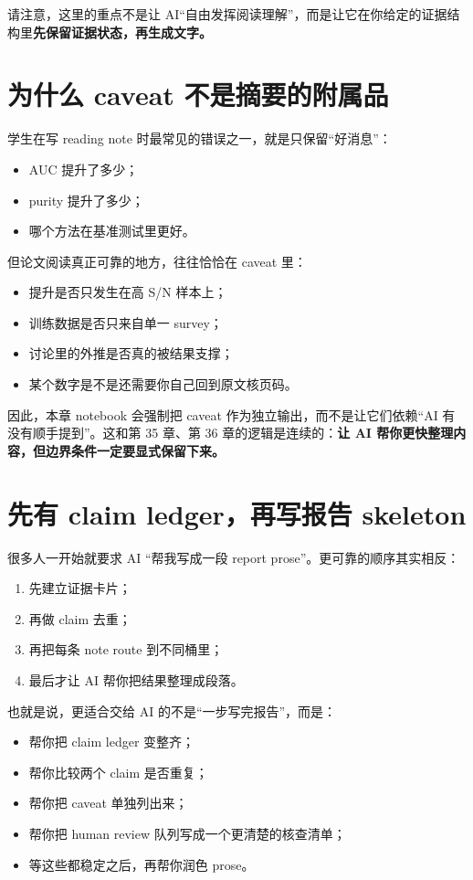 请注意，这里的重点不是让 AI“自由发挥阅读理解”，而是让它在你给定的证据结构里\textbf{先保留证据状态，再生成文字。}

\section{为什么 caveat 不是摘要的附属品}

学生在写 reading note 时最常见的错误之一，就是只保留“好消息”：

\begin{itemize}
    \item AUC 提升了多少；
    \item purity 提升了多少；
    \item 哪个方法在基准测试里更好。
\end{itemize}

但论文阅读真正可靠的地方，往往恰恰在 caveat 里：

\begin{itemize}
    \item 提升是否只发生在高 S/N 样本上；
    \item 训练数据是否只来自单一 survey；
    \item 讨论里的外推是否真的被结果支撑；
    \item 某个数字是不是还需要你自己回到原文核页码。
\end{itemize}

因此，本章 notebook 会强制把 caveat 作为独立输出，而不是让它们依赖“AI 有没有顺手提到”。这和第 35 章、第 36 章的逻辑是连续的：\textbf{让 AI 帮你更快整理内容，但边界条件一定要显式保留下来。}

\section{先有 claim ledger，再写报告 skeleton}

很多人一开始就要求 AI “帮我写成一段 report prose”。更可靠的顺序其实相反：

\begin{enumerate}
    \item 先建立证据卡片；
    \item 再做 claim 去重；
    \item 再把每条 note route 到不同桶里；
    \item 最后才让 AI 帮你把结果整理成段落。
\end{enumerate}

也就是说，更适合交给 AI 的不是“一步写完报告”，而是：

\begin{itemize}
    \item 帮你把 claim ledger 变整齐；
    \item 帮你比较两个 claim 是否重复；
    \item 帮你把 caveat 单独列出来；
    \item 帮你把 human review 队列写成一个更清楚的核查清单；
    \item 等这些都稳定之后，再帮你润色 prose。
\end{itemize}

